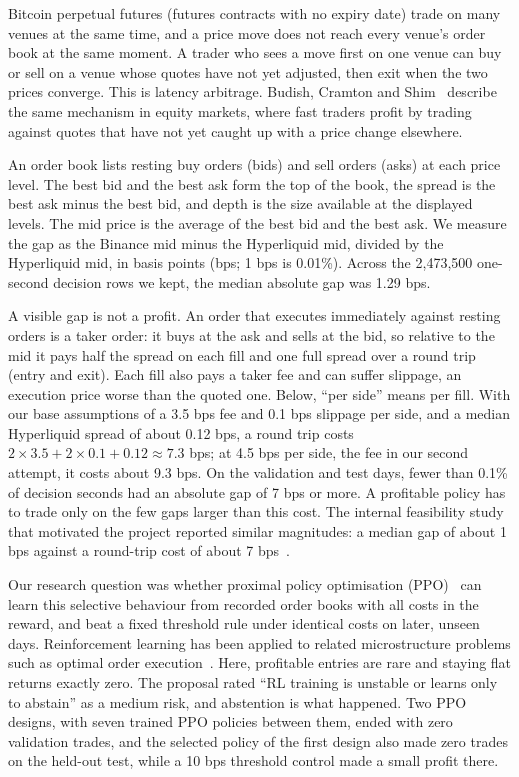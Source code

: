 \documentclass[12pt,a4paper]{article}
\DeclareRobustCommand{\bps}{\ifmmode\,\text{bps}\else\,bps\fi}
\begin{document}
Bitcoin perpetual futures (futures contracts with no expiry date) trade on many venues at
the same time, and a price move does not reach every venue's order book at the same moment.
A trader who sees a move first on one venue can buy or sell on a venue whose quotes have not
yet adjusted, then exit when the two prices converge. This is latency arbitrage. Budish,
Cramton and Shim~\cite{budish} describe the same mechanism in equity markets, where fast
traders profit by trading against quotes that have not yet caught up with a price change
elsewhere.

An order book lists resting buy orders (bids) and sell orders (asks) at each price level.
The best bid and the best ask form the top of the book, the spread is the best ask minus the
best bid, and depth is the size available at the displayed levels. The mid price is the
average of the best bid and the best ask. We measure the gap as the Binance mid minus the
Hyperliquid mid, divided by the Hyperliquid mid, in basis points (bps; 1\bps{} is 0.01\%).
Across the 2,473,500 one-second decision rows we kept, the median absolute gap was
1.29\bps.

A visible gap is not a profit. An order that executes immediately against resting orders is
a taker order: it buys at the ask and sells at the bid, so relative to the mid it pays half
the spread on each fill and one full spread over a round trip (entry and exit). Each fill
also pays a taker fee and can suffer slippage, an execution price worse than the quoted one.
Below, ``per side'' means per fill. With our base assumptions of a 3.5\bps{} fee and
0.1\bps{} slippage per side, and a median Hyperliquid spread of about 0.12\bps, a round trip
costs $2\times3.5 + 2\times0.1 + 0.12 \approx 7.3$\bps; at 4.5\bps{} per side, the fee in our
second attempt, it costs about 9.3\bps. On the validation and test days, fewer than 0.1\% of
decision seconds had an absolute gap of 7\bps{} or more. A profitable policy has to trade
only on the few gaps larger than this cost. The internal feasibility study that motivated the
project reported similar magnitudes: a median gap of about 1\bps{} against a round-trip cost
of about 7\bps~\cite{report}.

Our research question was whether proximal policy optimisation (PPO)~\cite{ppo} can learn
this selective behaviour from recorded order books with all costs in the reward, and beat a
fixed threshold rule under identical costs on later, unseen days. Reinforcement learning has
been applied to related microstructure problems such as optimal order
execution~\cite{nevmyvaka}. Here, profitable entries are rare and staying flat returns exactly
zero. The proposal rated ``RL training is unstable or learns only to abstain'' as a medium
risk, and abstention is what happened. Two PPO designs, with seven trained PPO policies
between them, ended with zero validation trades, and the selected policy of the first design
also made zero trades on the held-out test, while a 10\bps{} threshold control made a small
profit there.
\end{document}
